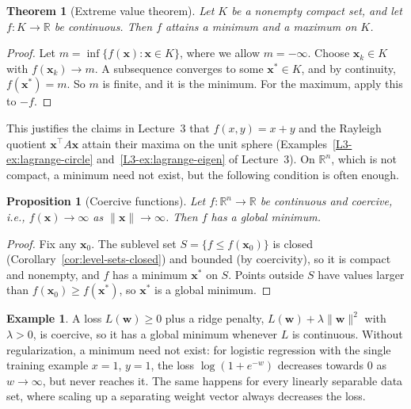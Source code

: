 \documentclass[11pt]{article}
\newcommand{\norm}[1]{\lVert #1 \rVert}
\theoremstyle{definition}
\newtheorem{example}[definition]{Example}
\theoremstyle{plain}
\newtheorem{theorem}[definition]{Theorem}
\newtheorem{proposition}[definition]{Proposition}
\theoremstyle{remark}
\begin{document}
\begin{theorem}[Extreme value theorem]\label{thm:extreme-value}
    Let $K$ be a nonempty compact set, and let $f: K \to \mathbb{R}$ be continuous. Then $f$ attains a minimum and a maximum on $K$.
\end{theorem}

\begin{proof}
    Let $m = \inf\{f(\mathbf{x}) : \mathbf{x} \in K\}$, where we allow $m = -\infty$. Choose $\mathbf{x}_k \in K$ with $f(\mathbf{x}_k) \to m$. A subsequence converges to some $\mathbf{x}^* \in K$, and by continuity, $f(\mathbf{x}^*) = m$. So $m$ is finite, and it is the minimum. For the maximum, apply this to $-f$.
\end{proof}

This justifies the claims in Lecture~3 that $f(x, y) = x + y$ and the Rayleigh quotient $\mathbf{x}^\top A\mathbf{x}$ attain their maxima on the unit sphere (Examples~\ref{L3-ex:lagrange-circle} and~\ref{L3-ex:lagrange-eigen} of Lecture~3). On $\mathbb{R}^n$, which is not compact, a minimum need not exist, but the following condition is often enough.

\begin{proposition}[Coercive functions]\label{prop:coercive}
    Let $f: \mathbb{R}^n \to \mathbb{R}$ be continuous and coercive, i.e., $f(\mathbf{x}) \to \infty$ as $\norm{\mathbf{x}} \to \infty$. Then $f$ has a global minimum.
\end{proposition}

\begin{proof}
    Fix any $\mathbf{x}_0$. The sublevel set $S = \{f \leq f(\mathbf{x}_0)\}$ is closed (Corollary~\ref{cor:level-sets-closed}) and bounded (by coercivity), so it is compact and nonempty, and $f$ has a minimum $\mathbf{x}^*$ on $S$. Points outside $S$ have values larger than $f(\mathbf{x}_0) \geq f(\mathbf{x}^*)$, so $\mathbf{x}^*$ is a global minimum.
\end{proof}

\begin{example}\label{ex:existence-ml}
    A loss $L(\mathbf{w}) \geq 0$ plus a ridge penalty, $L(\mathbf{w}) + \lambda\norm{\mathbf{w}}^2$ with $\lambda > 0$, is coercive, so it has a global minimum whenever $L$ is continuous. Without regularization, a minimum need not exist: for logistic regression with the single training example $x = 1$, $y = 1$, the loss $\log(1 + e^{-w})$ decreases towards $0$ as $w \to \infty$, but never reaches it. The same happens for every linearly separable data set, where scaling up a separating weight vector always decreases the loss.
\end{example}
\end{document}
